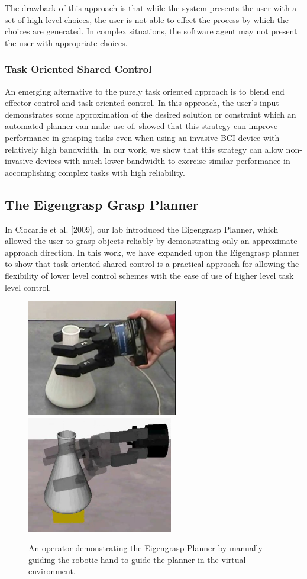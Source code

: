 The drawback of this approach is that while the system presents the user with a set of high level choices, the user is not able to effect the process by which the choices are generated. In complex situations, the software agent may not present the user with appropriate choices. 

\subsubsection{Task Oriented Shared Control}
An emerging alternative to the purely task oriented approach is to blend end effector control and task oriented control. In this approach, the user's input demonstrates some approximation of the desired solution or constraint which an automated planner can make use of. \cite{Mulling2015} showed that this strategy can improve performance in grasping tasks even when using an invasive BCI device with relatively high bandwidth. In our work, we show that this strategy can allow non-invasive devices with much lower bandwidth to exercise similar performance in accomplishing complex tasks with high reliability. 

\subsection{The Eigengrasp Grasp Planner}
 In Ciocarlie et al. [2009], our lab introduced the Eigengrasp Planner, which allowed the user to grasp objects reliably by demonstrating only an approximate approach direction. In this work, we have expanded upon the Eigengrasp planner to show that task oriented shared control is a practical approach for allowing the flexibility of lower level control schemes with the ease of use of higher level task level control. 

\begin{figure}[b]
	\includegraphics[height=2in]{images_2/real_eg_grasp.png}
	\includegraphics[height=2in]{images_2/simulated_eg_grasp2.png}
	\caption{An operator demonstrating the Eigengrasp Planner by manually guiding the robotic hand to guide the planner in the virtual environment.\cite{CiocarlieIJRR}}
	\label{fig:egplanner_demo} 
\end{figure}

